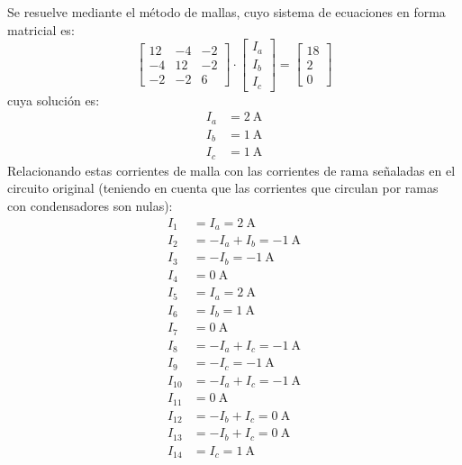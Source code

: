 Se resuelve mediante el método de mallas, cuyo sistema de ecuaciones
en forma matricial es:
\begin{equation*}
  \begin{bmatrix}
    12 & -4 & -2 \\
    -4 & 12 & -2\\
    -2 & -2 & 6
  \end{bmatrix}
  \cdot\begin{bmatrix}
         I_a\\
         I_b\\
         I_c
       \end{bmatrix}
       =
       \begin{bmatrix}
         18\\
         2\\
         0
       \end{bmatrix}
     \end{equation*}
     cuya solución es:
     \begin{align*}
       I_{a} & =  \qty{2}{\ampere}\\
       I_{b} & =  \qty{1}{\ampere}\\
       I_{c} & =  \qty{1}{\ampere}
     \end{align*}
     Relacionando estas corrientes de malla con las corrientes de rama
     señaladas en el circuito original (teniendo en cuenta que las
     corrientes que circulan por ramas con condensadores son nulas):
     \begin{align*}
       I_{1} & =  I_{a} = \qty{2}{\ampere}\\
       I_{2} & =  -I_{a}+I_{b} = \qty{-1}{\ampere}\\
       I_{3} & =  -I_{b} = \qty{-1}{\ampere}\\
       I_{4} & =  \qty{0}{\ampere}\\
       I_{5} & =  I_{a} = \qty{2}{\ampere}\\
       I_{6} & =  I_{b} = \qty{1}{\ampere}\\
       I_{7} & =  \qty{0}{\ampere}\\
       I_{8} & =  -I_{a}+I_{c} = \qty{-1}{\ampere}\\
       I_{9} & =  -I_{c} = \qty{-1}{\ampere}\\
       I_{10} & = -I_{a}+I_{c} = \qty{-1}{\ampere}\\
       I_{11} & =  \qty{0}{\ampere}\\
       I_{12} & =  -I_{b}+I_{c} = \qty{0}{\ampere}\\
       I_{13} & =  -I_{b}+I_{c} = \qty{0}{\ampere}\\
       I_{14} & =  I_{c} = \qty{1}{\ampere}
     \end{align*}

